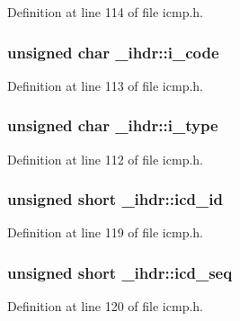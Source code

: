 \-Definition at line 114 of file icmp.\-h.

\hypertarget{struct__ihdr_abfe0b610d94a9d3abf86618edc169edf}{
\subsubsection[{i\-\_\-code}]{\setlength{\rightskip}{0pt plus 5cm}unsigned char {\bf \-\_\-ihdr\-::i\-\_\-code}}}\label{struct__ihdr_abfe0b610d94a9d3abf86618edc169edf}


\-Definition at line 113 of file icmp.\-h.

\hypertarget{struct__ihdr_a397fe195616b23c60093545fc8595112}{
\subsubsection[{i\-\_\-type}]{\setlength{\rightskip}{0pt plus 5cm}unsigned char {\bf \-\_\-ihdr\-::i\-\_\-type}}}\label{struct__ihdr_a397fe195616b23c60093545fc8595112}


\-Definition at line 112 of file icmp.\-h.

\hypertarget{struct__ihdr_a55f8e45d5702dce3c541858b0c5050ab}{
\subsubsection[{icd\-\_\-id}]{\setlength{\rightskip}{0pt plus 5cm}unsigned short {\bf \-\_\-ihdr\-::icd\-\_\-id}}}\label{struct__ihdr_a55f8e45d5702dce3c541858b0c5050ab}


\-Definition at line 119 of file icmp.\-h.

\hypertarget{struct__ihdr_ae9eb480801731dd6c2d0e512cb3ff6bf}{
\subsubsection[{icd\-\_\-seq}]{\setlength{\rightskip}{0pt plus 5cm}unsigned short {\bf \-\_\-ihdr\-::icd\-\_\-seq}}}\label{struct__ihdr_ae9eb480801731dd6c2d0e512cb3ff6bf}


\-Definition at line 120 of file icmp.\-h.

